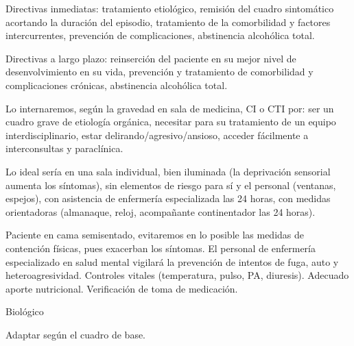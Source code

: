 \documentclass[encares.tex]{subfiles}
\begin{document}
Directivas inmediatas: tratamiento etiológico, remisión del cuadro sintomático acortando la duración del episodio, tratamiento de la comorbilidad y factores intercurrentes, prevención de complicaciones, abstinencia alcohólica total.

Directivas a largo plazo: reinserción del paciente en su mejor nivel de desenvolvimiento en su vida, prevención y tratamiento de comorbilidad y complicaciones crónicas, abstinencia alcohólica total.

Lo internaremos, según la gravedad en sala de medicina, CI o CTI por: ser un cuadro grave de etiología orgánica, necesitar para su tratamiento de un equipo interdisciplinario, estar delirando/agresivo/ansioso, acceder fácilmente a interconsultas y paraclínica.

Lo ideal sería en una sala individual, bien iluminada (la deprivación sensorial aumenta los síntomas), sin elementos de riesgo para sí y el personal (ventanas, espejos), con asistencia de enfermería especializada las 24 horas, con medidas orientadoras (almanaque, reloj, acompañante continentador las 24 horas).

Paciente en cama semisentado, evitaremos en lo posible las medidas de contención físicas, pues exacerban los síntomas. El personal de enfermería especializado en salud mental vigilará la prevención de intentos de fuga, auto y heteroagresividad. Controles vitales (temperatura, pulso, PA, diuresis). Adecuado aporte nutricional. Verificación de toma de medicación.

Biológico

Adaptar según el cuadro de base.
\end{document}

